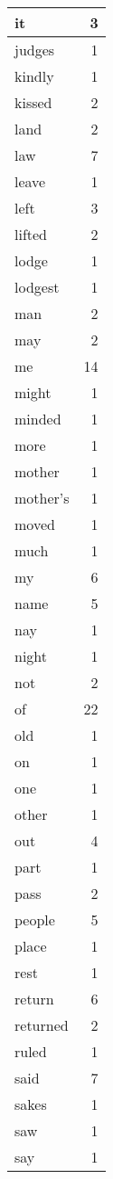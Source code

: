 \begin{center}
\begin{longtable}{l|r}
it & 3 \\ \hline
judges & 1 \\ \hline
kindly & 1 \\ \hline
kissed & 2 \\ \hline
land & 2 \\ \hline
law & 7 \\ \hline
leave & 1 \\ \hline
left & 3 \\ \hline
lifted & 2 \\ \hline
lodge & 1 \\ \hline
lodgest & 1 \\ \hline
man & 2 \\ \hline
may & 2 \\ \hline
me & 14 \\ \hline
might & 1 \\ \hline
minded & 1 \\ \hline
more & 1 \\ \hline
mother & 1 \\ \hline
mother's & 1 \\ \hline
moved & 1 \\ \hline
much & 1 \\ \hline
my & 6 \\ \hline
name & 5 \\ \hline
nay & 1 \\ \hline
night & 1 \\ \hline
not & 2 \\ \hline
of & 22 \\ \hline
old & 1 \\ \hline
on & 1 \\ \hline
one & 1 \\ \hline
other & 1 \\ \hline
out & 4 \\ \hline
part & 1 \\ \hline
pass & 2 \\ \hline
people & 5 \\ \hline
place & 1 \\ \hline
rest & 1 \\ \hline
return & 6 \\ \hline
returned & 2 \\ \hline
ruled & 1 \\ \hline
said & 7 \\ \hline
sakes & 1 \\ \hline
saw & 1 \\ \hline
say & 1 \\ \hline

\end{longtable}
\end{center}
